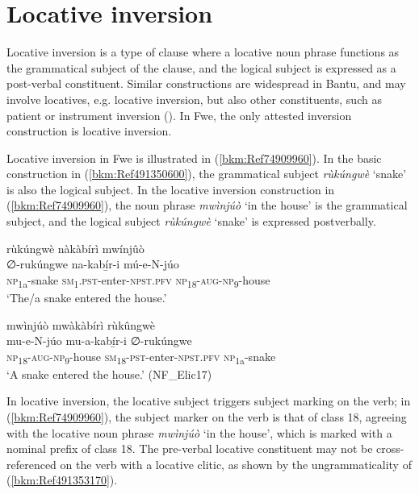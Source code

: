 \section{Locative inversion}
\label{bkm:Ref491361275}\label{bkm:Ref451503992}\hypertarget{Toc75352715}{}
Locative inversion is a type of clause where a locative noun phrase functions as the grammatical subject of the clause, and the logical subject is expressed as a post-verbal constituent. Similar constructions are widespread in Bantu, and may involve locatives, e.g. locative inversion, but also other constituents, such as patient or instrument inversion (\citealt{Wal2014}). In Fwe, the only attested inversion construction is locative inversion.

Locative inversion in Fwe is illustrated in (\ref{bkm:Ref74909960}). In the basic construction in (\ref{bkm:Ref491350600}), the grammatical subject \textit{rùkúngwè} ‘snake’ is also the logical subject. In the locative inversion construction in (\ref{bkm:Ref74909960}), the noun phrase \textit{mwìnjúò} ‘in the house’ is the grammatical subject, and the logical subject \textit{rùkúngwè} ‘snake’ is expressed postverbally.

\ea
\label{bkm:Ref491350600}
rùkúngwè nàkàbírì mwínjûò\\
\gll ∅-rukúngwe  na-kabí̲r-i      mú-e-N-júo\\
\textsc{np}\textsubscript{1a}-snake  \textsc{sm}\textsubscript{1}.\textsc{pst}-enter-\textsc{npst}.\textsc{pfv}  \textsc{np}\textsubscript{18}-\textsc{aug}-\textsc{np}\textsubscript{9}-house\\
\glt ‘The/a snake entered the house.’
\z

\ea
\label{bkm:Ref74909960}
mwìnjúò mwàkàbírì rùkûngwè\\
\gll mu-e-N-júo      mu-a-kabí̲r-i      ∅-rukúngwe\\
\textsc{np}\textsubscript{18}-\textsc{aug}-\textsc{np}\textsubscript{9}-house  \textsc{sm}\textsubscript{18}-\textsc{pst}-enter-\textsc{npst}.\textsc{pfv}  \textsc{np}\textsubscript{1a}-snake\\
\glt ‘A snake entered the house.’ (NF\_Elic17)
\z

In locative inversion, the locative subject triggers subject marking on the verb; in (\ref{bkm:Ref74909960}), the subject marker on the verb is that of class 18, agreeing with the locative noun phrase \textit{mwìnjúò} ‘in the house’, which is marked with a nominal prefix of class 18. The pre-verbal locative constituent may not be cross-referenced on the verb with a locative clitic, as shown by the ungrammaticality of (\ref{bkm:Ref491353170}).

